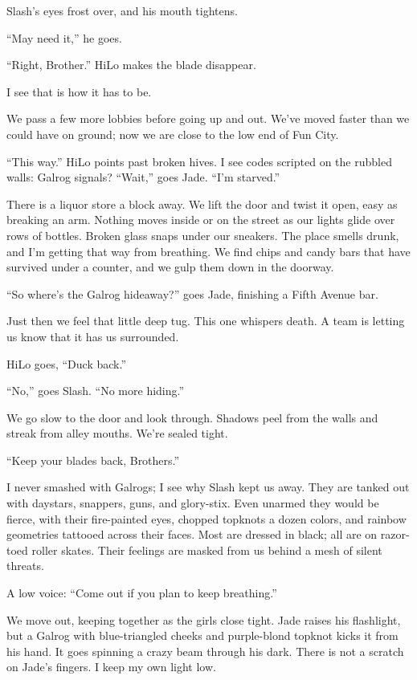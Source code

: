 Slash's eyes frost over, and his mouth tightens.

``May need it,'' he goes.

``Right, Brother.'' HiLo makes the blade disappear.

I see that is how it has to be.

We pass a few more lobbies before going up and out. We've moved faster than we could have on ground; now we are close to the low end of Fun City.

``This way.'' HiLo points past broken hives. I see codes scripted on the rubbled walls: Galrog signals?
``Wait,'' goes Jade. ``I'm starved.''

There is a liquor store a block away. We lift the door and twist it open, easy as breaking an arm. Nothing moves inside or on the street as our lights glide over rows of bottles. Broken glass snaps under our sneakers. The place smells drunk, and I'm getting that way from breathing. We find chips and candy bars that have survived under a counter, and we gulp them down in the doorway.

``So where's the Galrog hideaway?'' goes Jade, finishing a Fifth Avenue bar.

Just then we feel that little deep tug. This one whispers death. A team is letting us know that it has us surrounded.

HiLo goes, ``Duck back.''

``No,'' goes Slash. ``No more hiding.''

We go slow to the door and look through. Shadows peel from the walls and streak from alley mouths. We're sealed tight.

``Keep your blades back, Brothers.''

I never smashed with Galrogs; I see why Slash kept us away. They are tanked out with daystars, snappers, guns, and glory-stix. Even unarmed they would be fierce, with their fire-painted eyes, chopped topknots a dozen colors, and rainbow geometries tattooed across their faces. Most are dressed in black; all are on razor-toed roller skates.
Their feelings are masked from us behind a mesh of silent threats.

A low voice: ``Come out if you plan to keep breathing.''

We move out, keeping together as the girls close tight. Jade raises his flashlight, but a Galrog with blue-triangled cheeks and purple-blond topknot kicks it from his hand. It goes spinning a crazy beam through his dark. There is not a scratch on Jade's fingers. I keep my own light low.

